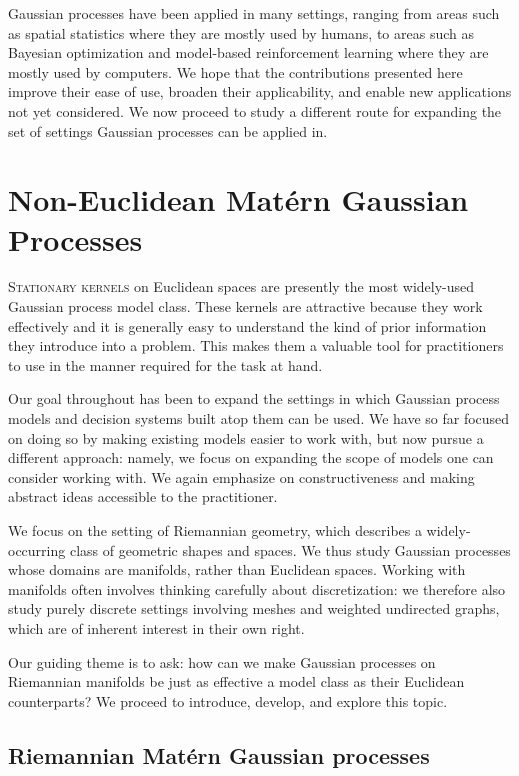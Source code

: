 \documentclass[11pt]{book}
\begin{document}
Gaussian processes have been applied in many settings, ranging from areas such as spatial statistics where they are mostly used by humans, to areas such as Bayesian optimization and model-based reinforcement learning where they are mostly used by computers.
We hope that the contributions presented here improve their ease of use, broaden their applicability, and enable new applications not yet considered.
We now proceed to study a different route for expanding the set of settings Gaussian processes can be applied in.








\chapter{Non-Euclidean Matérn Gaussian Processes}
\label{ch:noneuclidean}

\lettrine{S}{tationary kernels} on Euclidean spaces are presently the most widely-used Gaussian process model class.
These kernels are attractive because they work effectively and it is generally easy to understand the kind of prior information they introduce into a problem.
This makes them a valuable tool for practitioners to use in the manner required for the task at hand.

Our goal throughout has been to expand the settings in which Gaussian process models and decision systems built atop them can be used.
We have so far focused on doing so by making existing models easier to work with, but now pursue a different approach: namely, we focus on expanding the scope of models one can consider working with.
We again emphasize on constructiveness and making abstract ideas accessible to the practitioner.

We focus on the setting of Riemannian geometry, which describes a widely-occurring class of geometric shapes and spaces.
We thus study Gaussian processes whose domains are manifolds, rather than Euclidean spaces.
Working with manifolds often involves thinking carefully about discretization: we therefore also study purely discrete settings involving meshes and weighted undirected graphs, which are of inherent interest in their own right.

Our guiding theme is to ask: how can we make Gaussian processes on Riemannian manifolds be just as effective a model class as their Euclidean counterparts?
We proceed to introduce, develop, and explore this topic.


\section{Riemannian Matérn Gaussian processes}
\end{document}
